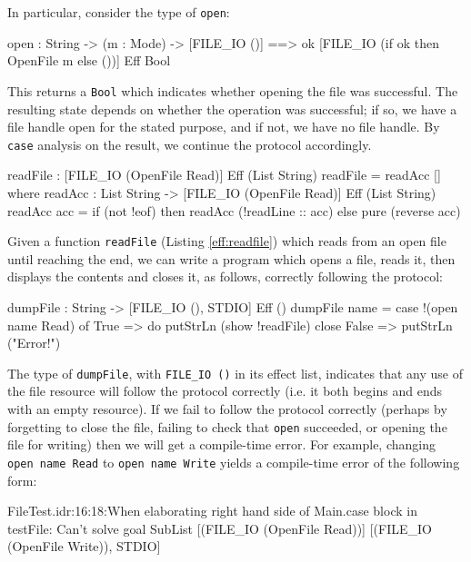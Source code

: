 \noindent
In particular, consider the type of \texttt{open}:

\begin{code}
open  : String -> (m : Mode) -> 
        { [FILE_IO ()] ==> 
          {ok} [FILE_IO (if ok then OpenFile m else ())] } Eff Bool
\end{code}

\noindent
This returns a \texttt{Bool} which indicates whether opening the file was
successful. The resulting state depends on whether the operation was successful;
if so, we have a file handle open for the stated purpose, and if not, we have
no file handle. By \texttt{case} analysis on the result, we continue the
protocol accordingly.

\begin{code}[float=h,frame=single, caption={Reading a File}, label=eff:readfile]
readFile : { [FILE_IO (OpenFile Read)] } Eff (List String)
readFile = readAcc [] where
    readAcc : List String -> { [FILE_IO (OpenFile Read)] }
              Eff (List String)
    readAcc acc = if (not !eof)
                     then readAcc (!readLine :: acc)
                     else pure (reverse acc)
\end{code}

Given a function \texttt{readFile} (Listing \ref{eff:readfile})
which reads from an open file until reaching the end, we can write a program
which opens a file, reads it, then displays the contents and closes it,
as follows, correctly following the protocol:

\begin{code}
dumpFile : String -> { [FILE_IO (), STDIO] } Eff ()
dumpFile name = case !(open name Read) of
                    True => do putStrLn (show !readFile)
                               close
                    False => putStrLn ("Error!")
\end{code}

\noindent
The type of \texttt{dumpFile}, with \texttt{FILE\_IO ()} in its effect
list, indicates that any use of the file resource will follow the protocol
correctly (i.e. it both begins and ends with an empty resource). If we fail
to follow the protocol correctly (perhaps by forgetting to close the file,
failing to check that \texttt{open} succeeded, or opening the file for writing)
then we will get a compile-time error. For example, changing \texttt{open name Read}
to \texttt{open name Write} yields a compile-time error of the following
form:

\begin{code}
FileTest.idr:16:18:When elaborating right hand side of Main.case 
block in testFile:
Can't solve goal 
        SubList [(FILE_IO (OpenFile Read))]
                [(FILE_IO (OpenFile Write)), STDIO]
\end{code}


